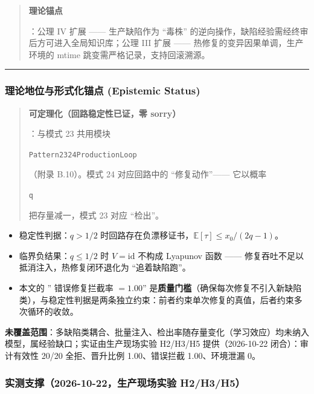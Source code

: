 \documentclass[
]{ctexart}
\renewcommand{\_}{\discretionary{}{}{\textunderscore}}
\begin{document}
\begin{quote}
\textbf{理论锚点}

：公理 IV 扩展 ------ 生产缺陷作为 ``毒株''
的逆向操作，缺陷经验需经终审后方可进入全局知识库；公理 III 扩展 ------
热修复的变异因果单调，生产环境的 mtime 跳变需严格记录，支持回滚溯源。
\end{quote}

\begin{center}\rule{0.5\linewidth}{0.5pt}\end{center}

\subsubsection{理论地位与形式化锚点 (Epistemic
Status)}\label{ux7406ux8bbaux5730ux4f4dux4e0eux5f62ux5f0fux5316ux951aux70b9-epistemic-status-2}

\begin{quote}
\textbf{可定理化（回路稳定性已证，零 sorry）}

：与模式 23 共用模块

\texttt{Pattern23\_24\_ProductionLoop}

（附录 B.10）。模式 24 对应回路中的 ``修复动作''------ 它以概率

\texttt{q}

把存量减一，模式 23 对应 ``检出''。
\end{quote}

\begin{itemize}
\item
  稳定性判据：\(q>1/2\)
  时回路存在负漂移证书，\(\mathbb E[\tau]\le x_0/(2q-1)\)。
\item
  临界负结果：\(q\le1/2\) 时 \(V=\mathrm{id}\) 不构成 Lyapunov 函数
  ------ 修复吞吐不足以抵消注入，热修复闭环退化为 ``追着缺陷跑''。
\item
  本文的 '' 错误修复拦截率 \(=1.00\)''
  是\textbf{质量门槛}（确保每次修复不引入新缺陷类），与稳定性判据是两条独立约束：前者约束单次修复的真值，后者约束多次循环的收敛。
\end{itemize}

\textbf{未覆盖范围}：多缺陷类耦合、批量注入、检出率随存量变化（学习效应）均未纳入模型，属经验缺口；实证由生产现场实验
H2/H3/H5 提供（2026-10-22 闭合）：审计有效性 20/20 全拒、晋升比例
1.00、错误拦截 1.00、环境泄漏 0。

\subsubsection{实测支撑（2026-10-22，生产现场实验
H2/H3/H5）}\label{ux5b9eux6d4bux652fux64912026-10-22ux751fux4ea7ux73b0ux573aux5b9eux9a8c-h2h3h5}
\end{document}
